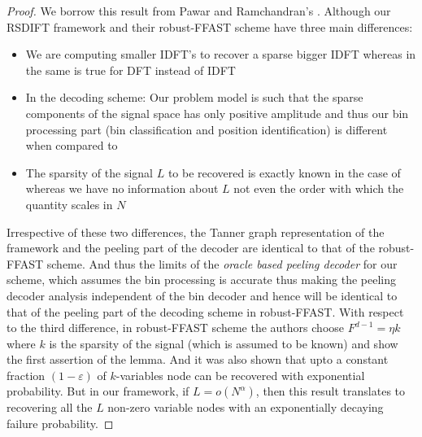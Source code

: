 \begin{proof}
We borrow this result from Pawar and Ramchandran's \cite{pawar2014robust}. Although our RSDIFT framework and their robust-FFAST scheme have three main differences: 
\begin{itemize}
\item We are computing smaller IDFT's to recover a sparse bigger IDFT whereas in \cite{pawar2014robust} the same is true for DFT instead of IDFT
\item In the decoding scheme: Our problem model is such that the sparse components of the signal space has only positive amplitude and thus our bin processing part (bin classification and position identification) is different when compared to \cite{pawar2014robust}
\item The sparsity of the signal $L$ to be recovered is exactly known in the case of \cite{pawar2014robust} whereas we have no information  about $L$ not even the order with which the quantity scales in $N$
\end{itemize}
Irrespective of these two differences, the Tanner graph representation of the framework and the peeling part of the decoder are identical to that of the robust-FFAST scheme. And thus the limits of the {\it oracle based peeling decoder} for our scheme, which assumes the bin processing is accurate thus making the peeling decoder analysis independent of the bin decoder and hence will be identical to that of the peeling part of the decoding scheme in robust-FFAST. With respect to the third difference, in robust-FFAST scheme the authors choose $F^{d-1}=\eta k$ where $k$ is the sparsity of the signal (which is assumed to be known) and show the first assertion of the lemma. And it was also shown that upto a constant fraction $(1-\varepsilon)$ of $k$-variables node can be recovered with exponential probability. But in our framework, if $L=o(N^{\alpha})$, then this result translates to recovering all the $L$ non-zero variable nodes with an exponentially decaying failure  probability.
\end{proof}

